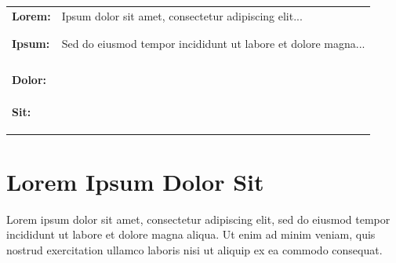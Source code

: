 \begin{tcolorbox}[
	title={\textbf{Lorem Ipsum Dolor} \hfill \it{Exercise 1}},
	colback=gray!5,
	width=\textwidth,
	right=1cm, top=0.5cm, bottom=0.5cm
	]
	
	\begin{tabular}{p{3cm} p{7cm}}
	\textbf{Lorem:} & Ipsum dolor sit amet, consectetur adipiscing elit... \\
	& \underline{\hspace{7cm}} \\
	& \\
	\textbf{Ipsum:} & Sed do eiusmod tempor incididunt ut labore et dolore magna... \\
	& \underline{\hspace{7cm}} \\
	& \underline{\hspace{7cm}} \\
	& \underline{\hspace{7cm}} \\
	& \\
	\textbf{Dolor:} & \underline{\hspace{7cm}} \\
	& \underline{\hspace{7cm}} \\
	& \underline{\hspace{7cm}} \\
	& \\
	\textbf{Sit:} & \underline{\hspace{7cm}} \\
	& \underline{\hspace{7cm}} \\
	& \underline{\hspace{7cm}} \\
	& \\
\end{tabular}
	
\end{tcolorbox}

\section{Lorem Ipsum Dolor Sit}

Lorem ipsum dolor sit amet, consectetur adipiscing elit, sed do eiusmod tempor incididunt ut labore et dolore magna aliqua. Ut enim ad minim veniam, quis nostrud exercitation ullamco laboris nisi ut aliquip ex ea commodo consequat.

